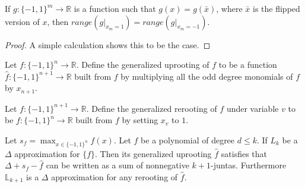 \begin{lemma}\label{even_functions}
If $g:\{-1,1\}^m \rightarrow \mathbb{R}$ is a function such that $g(x) = g(\bar{x})$, where $\bar{x}$ is the flipped version of $x$, then $range(g|_{x_m = 1}) = range(g |_{x_m =-1})$.
\end{lemma}

\begin{proof}
A simple calculation shows this to be the case.
\end{proof}


\begin{definition}
Let $f:\{-1,1\}^n \rightarrow \mathbb{R}$. Define the generalized uprooting of $f$ to be  a function $\hat{f} : \{-1,1\}^{n+1} \rightarrow \mathbb{R}$ built from $f$ by multiplying all the odd degree monomials of $f$ by $x_{n+1}$.
\end{definition}

\begin{definition}
Let $f:\{-1,1\}^{n+1} \rightarrow \mathbb{R}$. Define the generalized rerooting of $f$ under variable $v$ to be $\underbar{f}:\{-1,1\}^n\rightarrow \mathbb{R}$ built from $f$ by setting $x_{v}$ to $1$. 
\end{definition}

\begin{lemma}
Let $s_f = \max_{x \in \{-1,1\}^n} f(x)$. Let $f$ be a polynomial of degree $d \leq k$. If $L_k$ be a $\Delta$ approximation for $\{f\}$. Then its generalized uprooting $\hat{f}$ satisfies that $\Delta + s_f - \hat{f}$ can be written as a sum of nonnegative $k+1$-juntas. Furthermore $\mathbb{L}_{k+1}$ is a $\Delta$ approximation for any rerooting of $\hat{f}$.
\end{lemma}

